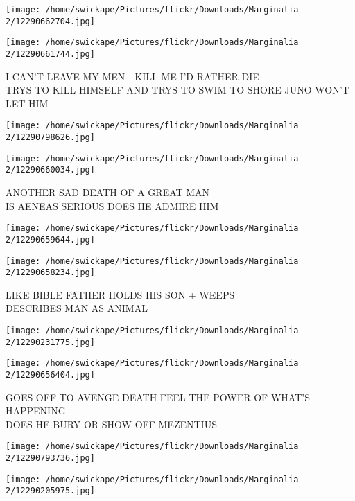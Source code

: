 \documentclass[10pt,letterpaper]{article}
\begin{document}
\texttt{[image: /home/swickape/Pictures/flickr/Downloads/Marginalia 2/12290662704.jpg]}

\vspace{0.25in}
\texttt{[image: /home/swickape/Pictures/flickr/Downloads/Marginalia 2/12290661744.jpg]}

I CAN'T LEAVE MY MEN {-} KILL ME I'D RATHER DIE\\
TRYS TO KILL HIMSELF AND TRYS TO SWIM TO SHORE JUNO WON'T LET HIM\\
\pagebreak

\texttt{[image: /home/swickape/Pictures/flickr/Downloads/Marginalia 2/12290798626.jpg]}

\vspace{0.25in}
\texttt{[image: /home/swickape/Pictures/flickr/Downloads/Marginalia 2/12290660034.jpg]}

ANOTHER SAD DEATH OF A GREAT MAN\\
IS AENEAS SERIOUS DOES HE ADMIRE HIM\\
\pagebreak

\texttt{[image: /home/swickape/Pictures/flickr/Downloads/Marginalia 2/12290659644.jpg]}

\vspace{0.25in}
\texttt{[image: /home/swickape/Pictures/flickr/Downloads/Marginalia 2/12290658234.jpg]}

LIKE BIBLE FATHER HOLDS HIS SON + WEEPS\\
DESCRIBES MAN AS ANIMAL\\
\pagebreak

\texttt{[image: /home/swickape/Pictures/flickr/Downloads/Marginalia 2/12290231775.jpg]}

\vspace{0.25in}
\texttt{[image: /home/swickape/Pictures/flickr/Downloads/Marginalia 2/12290656404.jpg]}

GOES OFF TO AVENGE DEATH FEEL THE POWER OF WHAT'S HAPPENING\\
DOES HE BURY OR SHOW OFF MEZENTIUS\\
\pagebreak

\texttt{[image: /home/swickape/Pictures/flickr/Downloads/Marginalia 2/12290793736.jpg]}

\vspace{0.25in}
\texttt{[image: /home/swickape/Pictures/flickr/Downloads/Marginalia 2/12290205975.jpg]}
\end{document}
